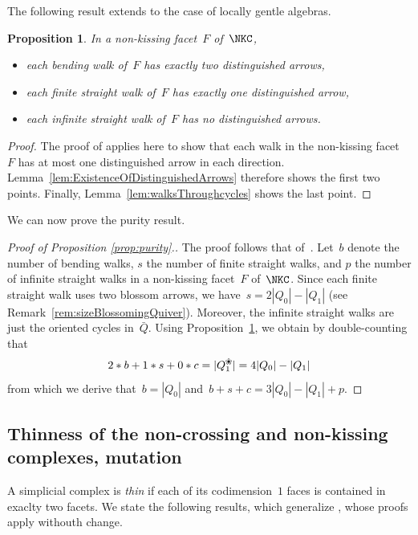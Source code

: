 \documentclass{amsart}
\newtheorem{proposition}[theorem]{Proposition}
\theoremstyle{definition}
\newcommand{\darkblue}{\color{darkblue}} %
\newcommand{\defn}[1]{\textsl{\darkblue #1}} %
\newcommand{\blossom}{^\text{\ding{96}}} %
\begin{document}
The following result extends \cite[Prop.~2.26]{PaluPilaudPlamondon} to the case of locally gentle algebras.

\begin{proposition}
\label{prop:numberOfDistinguishedArrows}
In a non-kissing facet~$F$ of~$\NKC$,
\begin{itemize}
 \item each bending walk of~$F$ has exactly two distinguished arrows,
 \item each finite straight walk of~$F$ has exactly one distinguished arrow,
 \item each infinite straight walk of~$F$ has no distinguished arrows.
\end{itemize}
\end{proposition}

\begin{proof}
The proof of \cite[Prop.~2.26]{PaluPilaudPlamondon} applies here to show that each walk in the non-kissing facet~$F$ has at most one distinguished arrow in each direction.
Lemma~\ref{lem:ExistenceOfDistinguishedArrows} therefore shows the first two points.
Finally, Lemma~\ref{lem:walksThroughcycles} shows the last point.
\end{proof}
 
We can now prove the purity result.

\begin{proof}[Proof of Proposition \ref{prop:purity}.]
The proof follows that of~\cite[Cor.~2.27]{PaluPilaudPlamondon}.
Let~$b$ denote the number of bending walks, $s$ the number of finite straight walks, and $p$ the number of infinite straight walks in a non-kissing facet~$F$ of~$\NKC$.
Since each finite straight walk uses two blossom arrows, we have~$s = 2|Q_0|-|Q_1|$ (see Remark~\ref{rem:sizeBlossomingQuiver}).
Moreover, the infinite straight walks are just the oriented cycles in~$\bar Q$.
Using Proposition~\ref{prop:numberOfDistinguishedArrows}, we obtain by double-counting that
\[
2 * b + 1 * s + 0 * c= |Q_1\blossom| = 4|Q_0|-|Q_1|
\]
from which we derive that~$b = |Q_0|$ and~$b+s+c = 3|Q_0|-|Q_1|+p$.
\end{proof}

\subsection{Thinness of the non-crossing and non-kissing complexes, mutation}

A simplicial complex is \defn{thin} if each of its codimension~$1$ faces is contained in exaclty two facets.
We state the following results, which generalize \cite[Prop.~2.31 \& Cor.~2.33]{PaluPilaudPlamondon}, whose proofs apply withouth change.
\end{document}
